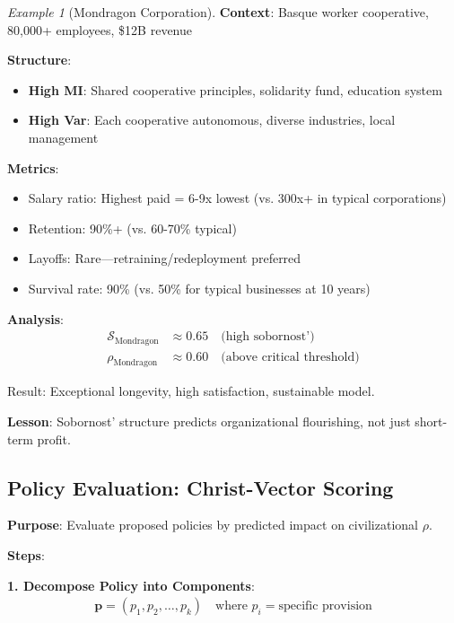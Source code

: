 \documentclass[11pt,a4paper]{article}
\theoremstyle{definition}
\theoremstyle{remark}
\newtheorem{example}{Example}[section]
\begin{document}
\begin{enumerate}
\begin{example}[Mondragon Corporation]
\textbf{Context}: Basque worker cooperative, 80,000+ employees, \$12B revenue

\textbf{Structure}:
\begin{itemize}
    \item \textbf{High MI}: Shared cooperative principles, solidarity fund, education system
    \item \textbf{High Var}: Each cooperative autonomous, diverse industries, local management
\end{itemize}

\textbf{Metrics}:
\begin{itemize}
    \item Salary ratio: Highest paid = 6-9x lowest (vs. 300x+ in typical corporations)
    \item Retention: 90\%+ (vs. 60-70\% typical)
    \item Layoffs: Rare—retraining/redeployment preferred
    \item Survival rate: 90\% (vs. 50\% for typical businesses at 10 years)
\end{itemize}

\textbf{Analysis}:
\begin{align}
\mathcal{S}_{\text{Mondragon}} &\approx 0.65 \quad \text{(high sobornost')} \\
\rho_{\text{Mondragon}} &\approx 0.60 \quad \text{(above critical threshold)}
\end{align}

Result: Exceptional longevity, high satisfaction, sustainable model.

\textbf{Lesson}: Sobornost' structure predicts organizational flourishing, not just short-term profit.
\end{example}

\subsection{Policy Evaluation: Christ-Vector Scoring}

\begin{protocol}
\textbf{Purpose}: Evaluate proposed policies by predicted impact on civilizational \(\rho\).

\textbf{Steps}:

\textbf{1. Decompose Policy into Components}:
\begin{align}
\mathbf{p} = (p_1, p_2, \ldots, p_k) \quad \text{where } p_i = \text{specific provision}
\end{align}


\end{protocol}
\end{enumerate}
\end{document}
